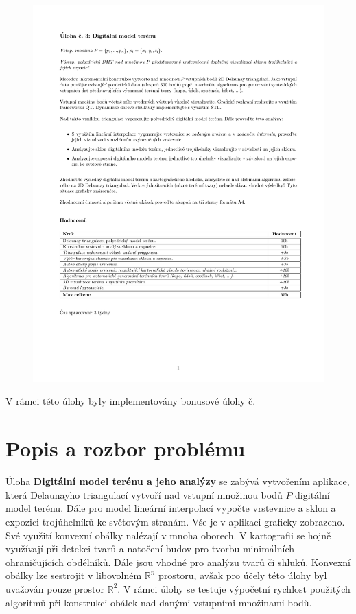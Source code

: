\documentclass[a4paper, 12pt]{article}
\begin{document}
\begin{figure}[h!]
	\includegraphics[clip, trim=0cm 4.5cm 0cm 3cm, width=1.0\textwidth]{./pictures/zadani03.pdf}
\end{figure}

V rámci této úlohy byly implementovány bonusové úlohy č. 
\clearpage

\section{Popis a rozbor problému}
Úloha \textbf{Digitální model terénu a jeho analýzy} se zabývá vytvořením aplikace, která Delaunayho triangulací vytvoří nad vstupní množinou bodů $P$ digitální model terénu. Dále  pro model lineární interpolací vypočte vrstevnice a sklon a expozici trojúhelníků ke světovým stranám. Vše je v aplikaci graficky zobrazeno.\\ 

Své využití konvexní obálky nalézají v mnoha oborech. V kartografii se hojně využívají při detekci tvarů a natočení budov pro tvorbu minimálních ohraničujících obdélníků. Dále jsou vhodné pro analýzu tvarů či shluků. Konvexní obálky lze sestrojit v libovolném $\mathbb{R}^n$ prostoru, avšak pro účely této úlohy byl uvažován pouze prostor $\mathbb{R}^2$. V rámci úlohy se testuje výpočetní rychlost použitých algoritmů při konstrukci obálek nad danými vstupními množinami bodů.
\end{document}
